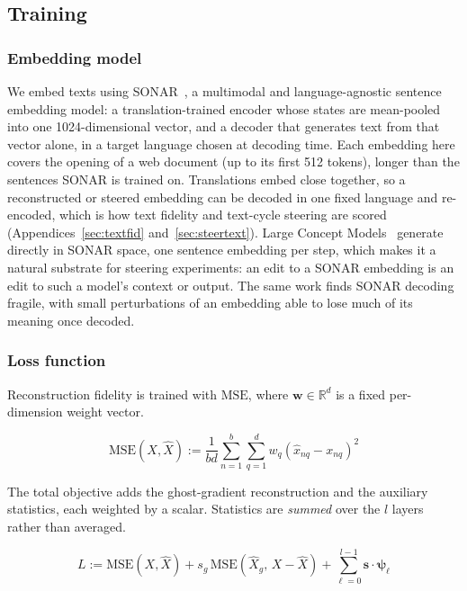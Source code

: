 \subsection{Training}
\label{sec:training}

\subsubsection{Embedding model}
\label{sec:sonar}
We embed texts using SONAR~\cite{sonar}, a multimodal and
language-agnostic sentence embedding model: a translation-trained encoder
whose states are mean-pooled into one 1024-dimensional vector, and a
decoder that generates text from that vector alone, in a target language
chosen at decoding time. Each embedding here covers the opening of a web
document (up to its first 512 tokens), longer than the sentences SONAR is
trained on. Translations embed close together, so a reconstructed or
steered embedding can be decoded in one fixed language and re-encoded,
which is how text fidelity and text-cycle steering are scored
(Appendices~\ref{sec:textfid} and~\ref{sec:steertext}).
Large Concept Models~\cite{lcmteam2024largeconceptmodelslanguage}
generate directly in SONAR space, one sentence embedding per step, which
makes it a natural substrate for steering experiments: an edit to a SONAR
embedding is an edit to such a model's context or output. The same work
finds SONAR decoding fragile, with small perturbations of an embedding
able to lose much of its meaning once decoded.

\subsubsection{Loss function}
\label{sec:loss}
Reconstruction fidelity is trained with $\mathrm{MSE}$, where
$\mathbf{w} \in \mathbb{R}^d$ is a fixed per-dimension weight vector.

\begin{equation}
	\mathrm{MSE}(X,\hat{X}) := \frac{1}{bd}\sum^{b}_{n=1}\sum^{d}_{q=1}
	w_q\left(\hat{x}_{nq} - x_{nq}\right)^2
	\label{eq:mse}
\end{equation}

The total objective adds the ghost-gradient reconstruction and the
auxiliary statistics, each weighted by a scalar. Statistics are
\emph{summed} over the $l$ layers rather than averaged.

\begin{equation}
	L := \mathrm{MSE}(X,\hat{X})
	+ s_g\,\mathrm{MSE}(\hat{X}_g,\, X - \hat{X})
	+ \sum^{l-1}_{\ell=0}\mathbf{s}\cdot\boldsymbol{\psi}_\ell
	\label{eq:loss_total}
\end{equation}

